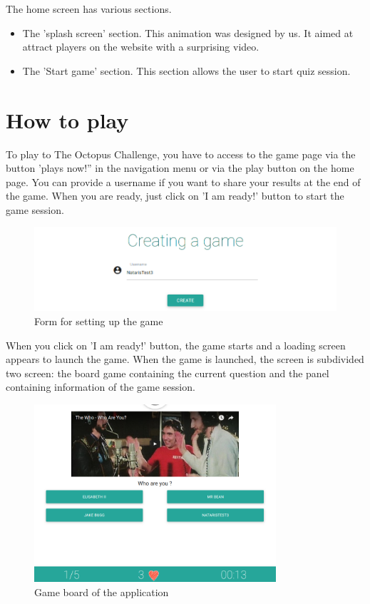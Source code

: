 \documentclass[a4paper,11pt, oneside]{book}
\def\appName{The Octopus Challenge}
\def\octopusName{Lord Octopus}
\begin{document}
The home screen has various sections.
\begin{itemize}
	\item The 'splash screen' section. This animation was designed by us. It aimed at attract players on the website with a surprising video.
	\item The 'Start game' section. This section allows the user to start quiz session.
\end{itemize}


	\section{How to play}

To play to \appName, you have to access to the game page via the button 'plays now!'' in the navigation menu or via the play button on the home page.
You can provide a username if you want to share your results at the end of the game.
When you are ready, just click on 'I am ready!' button to start the game session.

\begin{figure} [htbp]
	\centering
	\includegraphics[width=1\textwidth]{CCreate.png}
	\caption{Form for setting up the game}
\end{figure}

\noindent When you click on 'I am ready!' button, the game starts and a loading screen appears to launch the game.
When the game is launched, the screen is subdivided two screen: the board game containing the current question and the panel containing information of the game session.


\begin{figure} [htbp]
	\centering
	\includegraphics[width=0.8\textwidth]{CGame.png}
	\caption{Game board of the application}
\end{figure}
\end{document}
